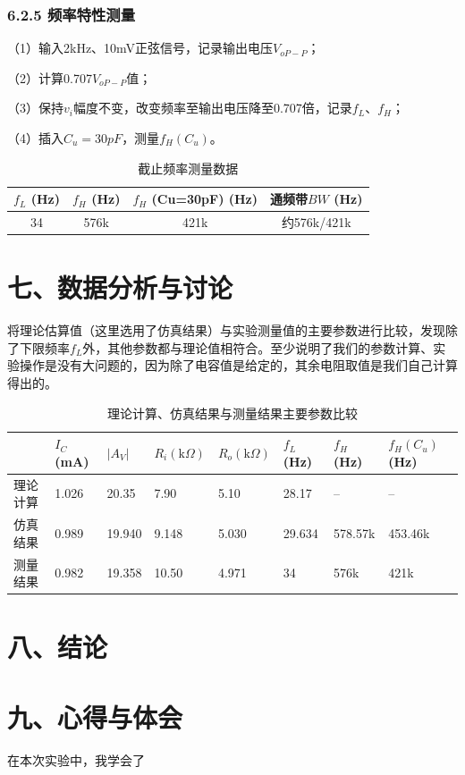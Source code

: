 \documentclass[12pt,a4paper]{article}
\begin{document}
\subsubsection*{6.2.5 频率特性测量}

（1）输入2kHz、10mV正弦信号，记录输出电压$V_{oP-P}$；

（2）计算0.707$V_{oP-P}$值；

（3）保持$v_i$幅度不变，改变频率至输出电压降至0.707倍，记录$f_L$、$f_H$；

（4）插入$C_u = 30pF$，测量$f_H(C_u)$。

\begin{table}[H]
\centering
\caption{截止频率测量数据}
\begin{tabular}{|c|c|c|c|}
\hline
 $f_L$ (Hz) & $f_H$ (Hz) & $f_H$ (Cu=30pF) (Hz) & 通频带$BW$ (Hz) \\
\hline
 34 &576k & 421k& 约576k/421k\\

\hline
\end{tabular}
\end{table}




\section*{七、数据分析与讨论}

将理论估算值（这里选用了仿真结果）与实验测量值的主要参数进行比较，发现除了下限频率$f_L$外，其他参数都与理论值相符合。至少说明了我们的参数计算、实验操作是没有大问题的，因为除了电容值是给定的，其余电阻取值是我们自己计算得出的。

\begin{table}[H]
\centering
\caption{理论计算、仿真结果与测量结果主要参数比较} 
\renewcommand{\arraystretch}{1.2}
\small
\begin{tabular}{|p{1.6cm}|p{1.4cm}|p{1.4cm}|p{1.4cm}|p{1.4cm}|p{1.4cm}|p{1.4cm}|p{1.8cm}|}
\hline
& $I_C$(mA) & $|A_V|$ &$R_i(\text{k}\Omega)$ &$R_o(\text{k}\Omega)$& $f_L$(Hz)& $f_H$(Hz)& $f_H(C_u)$(Hz)  \\
\hline
理论计算 &1.026 &20.35 &7.90 &5.10 &28.17 &-- &-- \\
\hline
仿真结果 &0.989 &19.940 &9.148 &5.030 &29.634 &578.57k & 453.46k \\
\hline
测量结果 &0.982 &19.358 &10.50&4.971 & 34 &576k &421k \\
\hline

\end{tabular}

\end{table}



\section*{八、结论}



\section*{九、心得与体会}

在本次实验中，我学会了
\end{document}
